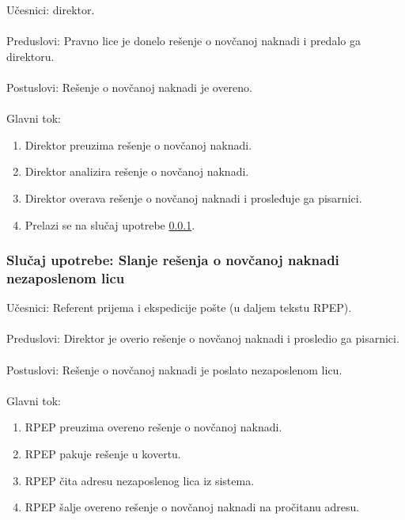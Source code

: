 \noindent Učesnici: direktor.
\\
\\ Preduslovi: Pravno lice je donelo rešenje o novčanoj naknadi i predalo ga direktoru.
\\
\\ Postuslovi: Rešenje o novčanoj naknadi je overeno.
\\
\\ Glavni tok:
\begin{enumerate}
\item Direktor preuzima rešenje o novčanoj naknadi.
\item Direktor analizira rešenje o novčanoj naknadi.
\item Direktor overava rešenje o novčanoj naknadi i prosleđuje ga pisarnici.
\item Prelazi se na slu\v caj upotrebe \ref{su: pisarnica}.
\end{enumerate}


\subsubsection{Slu\v caj upotrebe: Slanje rešenja o novčanoj naknadi nezaposlenom licu}
\label{su: pisarnica}

\noindent Učesnici: Referent prijema i ekspedicije pošte (u daljem tekstu RPEP).
\\
\\ Preduslovi: Direktor je overio rešenje o novčanoj naknadi i prosledio ga pisarnici.
\\
\\ Postuslovi: Rešenje o novčanoj naknadi je poslato nezaposlenom licu.
\\
\\ Glavni tok:
\begin{enumerate}
\item RPEP preuzima overeno rešenje o novčanoj naknadi.
\item RPEP pakuje rešenje u kovertu.
\item RPEP čita adresu nezaposlenog lica iz sistema.
\item RPEP šalje overeno rešenje o novčanoj naknadi na pročitanu adresu.
\end{enumerate}

